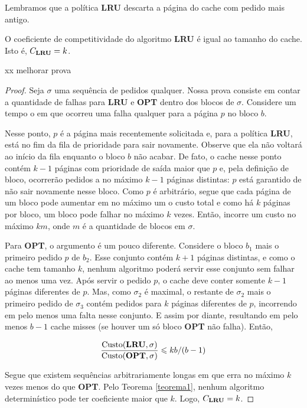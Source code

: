 \documentclass[a4paper,oneside,reqno,12pt]{amsart}
\begin{document}
Lembramos que a política \textbf{LRU} descarta a página do cache com pedido mais antigo. 

\begin{theorem}
  O coeficiente de competitividade do algoritmo \textbf{LRU} é igual ao tamanho do cache. Isto é, \(C_{\bold{LRU}} = k\).
\end{theorem}

xx melhorar prova
\begin{proof}
  Seja \(\sigma\) uma sequência de pedidos qualquer. Nossa prova consiste em contar a quantidade de falhas para \textbf{LRU} e \textbf{OPT} dentro dos blocos de \(\sigma\). Considere um tempo o em que ocorreu uma falha qualquer para a página \(p\) no bloco \(b\).

  Nesse ponto, \(p\) é a página mais recentemente solicitada e, para a política \textbf{LRU}, está no fim da fila de prioridade para sair novamente. Observe que ela não voltará ao início da fila enquanto o bloco \(b\) não acabar. De fato, o cache nesse ponto contém \(k-1\) páginas com prioridade de saída maior que \(p\) e, pela definição de bloco, ocorrerão pedidos a no máximo \(k-1\) páginas distintas: \(p\) está garantido de não sair novamente nesse bloco. Como \(p\) é arbitrário, segue que cada página de um bloco pode aumentar em no máximo um o custo total e como há \(k\) páginas por bloco, um bloco pode falhar no máximo \(k\) vezes. Então,  incorre um custo no máximo \(km\), onde \(m\) é a quantidade de blocos em \(\sigma\).

  Para \textbf{OPT}, o argumento é um pouco diferente. Considere o bloco \(b_1\) mais o primeiro pedido \(p\) de \(b_2\). Esse conjunto contém \(k+1\) páginas distintas, e como o cache tem tamanho \(k\), nenhum algoritmo poderá servir esse conjunto sem falhar ao menos uma vez. Após servir o pedido \(p\), o cache deve conter somente \(k-1\) páginas diferentes de \(p\). Mas, como \(\sigma_2\) é maximal, o restante de \(\sigma_2\) mais o primeiro pedido de \(\sigma_3\) contém pedidos para \(k\) páginas diferentes de \(p\), incorrendo em pelo menos uma falta nesse conjunto. E assim por diante, resultando em pelo menos \(b - 1\) cache misses (se houver um só bloco \textbf{OPT} não falha). Então, 

  \begin{equation*}
    \frac{\text{Custo}(\bold{LRU}, \sigma)}{\text{Custo}(\bold{OPT}, \sigma)} \leqslant kb/(b-1)
  \end{equation*}

  Segue que existem sequências arbitrariamente longas em que  erra no máximo \(k\) vezes menos do que \textbf{OPT}. Pelo Teorema \ref{teorema1}, nenhum algoritmo determinístico pode ter coeficiente maior que \(k\). Logo, \(C_{\bold{LRU}} = k\).
\end{proof}
\end{document}
